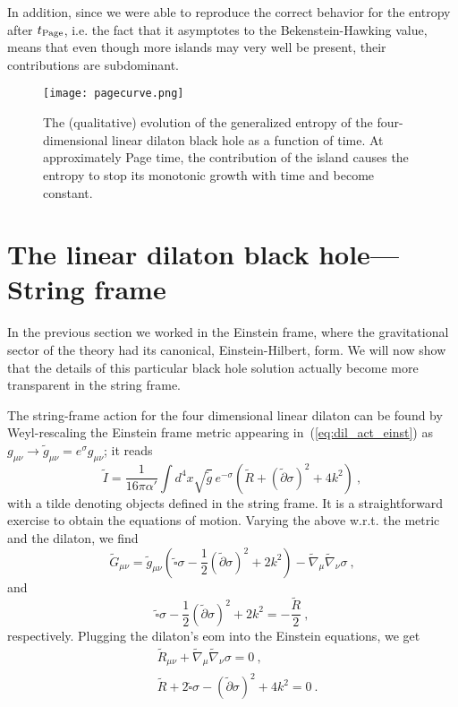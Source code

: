 \documentclass[a4paper, 12pt]{article}
\def\be{\begin{equation}}
\def\ee{\end{equation}}
\begin{document}
In addition, since we were able to reproduce the correct behavior for the entropy after $t_{\rm Page}$, i.e. the fact that it  asymptotes to the Bekenstein-Hawking value, means that even though more islands may very well be present, their contributions are subdominant. 

\begin{figure}[!h]
\centering
\texttt{[image: pagecurve.png]}
\caption{The (qualitative) evolution of the generalized entropy of the four-dimensional linear dilaton black hole as a function of time. At approximately Page time, the contribution of the island causes the entropy to stop its monotonic growth with time and become constant.}
    \label{fig:page_curve}
\end{figure}


\section{The linear dilaton black hole---String frame}
\label{sec:linear_dilaton_string}


In the previous section we worked in the Einstein frame, where the gravitational sector of the theory had its canonical, Einstein-Hilbert, form. We will now show that the details of this particular  black hole solution actually become more transparent in the string frame. 

The string-frame action for the four dimensional linear dilaton can be found by Weyl-rescaling the Einstein frame metric appearing in~(\ref{eq:dil_act_einst})
as $g_{\mu\nu} \to \tilde g_{\mu\nu} = e^\sigma g_{\mu\nu}$; it reads
\be
\label{eq:dil_act_string}
\widetilde{ I}= \frac{1}{16\pi \alpha'} \int d^4x \sqrt{\tilde g}\, e^{-\sigma}\left(\widetilde R + (\tilde \partial \sigma)^2 +4 k^2 \right) \ ,
\ee
with a tilde denoting objects defined in the string frame. 
It is a straightforward exercise to obtain the equations of motion. Varying the above w.r.t. the metric and the dilaton, we find 
\be
\label{eq:einst_string_frame}
\widetilde G_{\mu\nu} = \tilde g_{\mu\nu}\left(\widetilde \square \sigma -\frac{1}{2} (\tilde \partial \sigma)^2 +2 k^2 \right) -\widetilde\nabla_\mu \widetilde\nabla_\nu \sigma \ ,
\ee
and
\be
\widetilde\square \sigma -\frac{1}{2} (\tilde \partial \sigma)^2 +2 k^2 = -\frac{\widetilde R}{2} \ ,
\ee
respectively. Plugging the dilaton's eom into the Einstein equations, we get 
\be
\begin{aligned}
\label{eq:fixed_point}
&\widetilde R_{\mu\nu} +\widetilde\nabla_\mu \widetilde\nabla_\nu \sigma =0 \ , \\
&\widetilde R+2\widetilde\square \sigma - (\tilde \partial \sigma)^2
+4 k^2
= 0\ .
\end{aligned}
\ee
\end{document}
